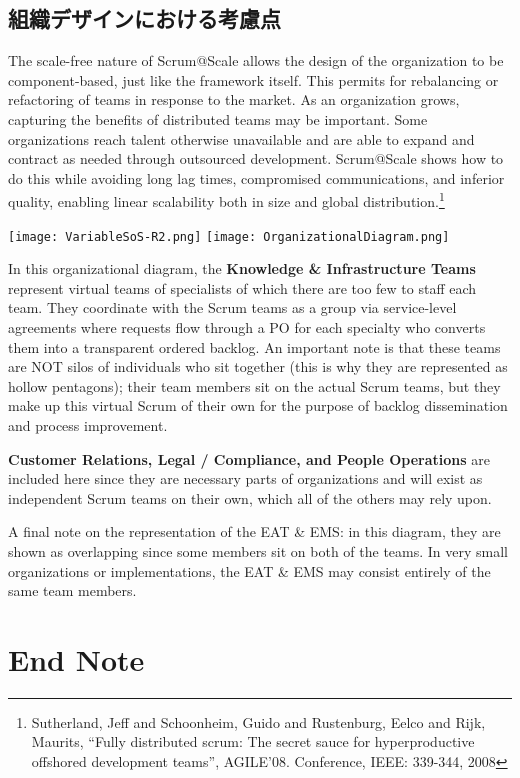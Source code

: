 \documentclass[12pt,a4paper,parskip=full]{scrartcl}
\begin{document}
\subsection{組織デザインにおける考慮点}
The scale-free nature of Scrum@Scale allows the design of the organization
to be component-based, just like the framework itself. This permits for
rebalancing or refactoring of teams in response to the market. As an
organization grows, capturing the benefits of distributed teams may be
important. Some organizations reach talent otherwise unavailable and are
able to expand and contract as needed through outsourced development.
Scrum@Scale shows how to do this while avoiding long lag times, compromised
communications, and inferior quality, enabling linear scalability both in
size and global distribution.\footnote{Sutherland, Jeff and Schoonheim,
Guido and Rustenburg, Eelco and Rijk, Maurits, ``Fully distributed scrum:
The secret sauce for hyperproductive offshored development teams'',
AGILE'08. Conference, IEEE: 339-344, 2008}

\texttt{[image: VariableSoS-R2.png]}
\texttt{[image: OrganizationalDiagram.png]}

In this organizational diagram, the \textbf{Knowledge \& Infrastructure
Teams} represent virtual teams of specialists of which there are too few to
staff each team. They coordinate with the Scrum teams as a group via
service-level agreements where requests flow through a PO for each
specialty who converts them into a transparent ordered backlog. An
important note is that these teams are NOT silos of individuals who sit
together (this is why they are represented as hollow pentagons); their team
members sit on the actual Scrum teams, but they make up this virtual Scrum
of their own for the purpose of backlog dissemination and process
improvement.

\textbf{Customer Relations, Legal / Compliance, and People Operations} are
included here since they are necessary parts of organizations and will
exist as independent Scrum teams on their own, which all of the others may
rely upon.

A final note on the representation of the EAT \& EMS: in this diagram, they
are shown as overlapping since some members sit on both of the teams. In very
small organizations or implementations, the EAT \& EMS may consist entirely
of the same team members.

\section{End Note}
\fi
\end{document}

